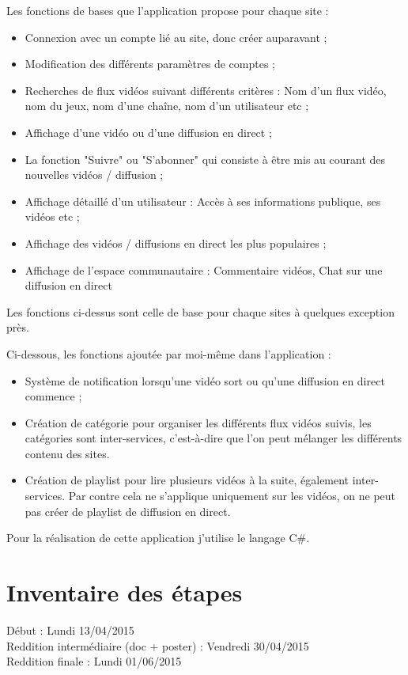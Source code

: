 \documentclass[11pt]{report} %
\begin{document}
	Les fonctions de bases que l’application propose pour chaque site :
	\begin{itemize}
		\item Connexion avec un compte lié au site, donc créer auparavant ;
		\item Modification des différents paramètres de comptes ;
		\item Recherches de flux vidéos suivant différents critères : Nom d’un flux vidéo, nom du jeux, nom d’une chaîne, nom d’un utilisateur etc ;
		\item Affichage d’une vidéo ou d’une diffusion en direct ;
		\item La fonction "Suivre" ou "S’abonner" qui consiste à être mis au courant des nouvelles vidéos / diffusion ;
		\item Affichage détaillé d’un utilisateur : Accès à ses informations publique, ses vidéos etc ;
		\item Affichage des vidéos / diffusions en direct les plus populaires ;
		\item Affichage de l’espace communautaire : Commentaire vidéos, Chat sur une diffusion en direct
	\end{itemize}
	
	Les fonctions ci-dessus sont celle de base pour chaque sites à quelques exception près.
	
	Ci-dessous, les fonctions ajoutée par moi-même dans l’application :
	\begin{itemize}
		\item Système de notification lorsqu’une vidéo sort ou qu’une diffusion en direct commence ;
		\item Création de catégorie pour organiser les différents flux vidéos suivis, les catégories sont inter-services, c'est-à-dire que l’on peut mélanger les différents contenu des sites.
		\item Création de playlist pour lire plusieurs vidéos à la suite, également inter-services. Par contre cela ne s'applique uniquement sur les vidéos, on ne peut pas créer de playlist de diffusion en direct.
	\end{itemize}

	Pour la réalisation de cette application j’utilise le langage C\#.

	\section{Inventaire des étapes}
	Début : Lundi 13/04/2015 \\
	Reddition intermédiaire (doc + poster) : Vendredi 30/04/2015 \\
	Reddition finale : Lundi 01/06/2015
	
\end{document}
